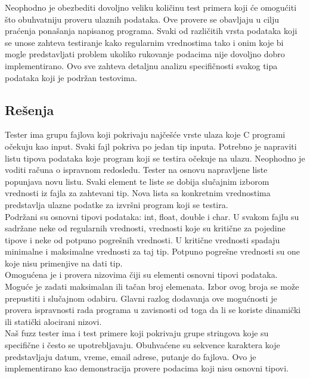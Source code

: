 \documentclass[a4paper]{article}
\begin{document}
{Neophodno je obezbediti dovoljno veliku količinu test primera koji će omogućiti što obuhvatniju proveru ulaznih podataka. Ove provere se obavljaju u cilju praćenja ponašanja napisanog programa. Svaki od različitih vrsta podataka koji se unose zahteva testiranje kako regularnim vrednostima tako i onim koje bi mogle predstavljati problem ukoliko rukovanje podacima nije dovoljno dobro implementirano. Ovo sve zahteva detaljnu analizu specifičnosti svakog tipa podataka koji je podržan testovima.

\subsection{Rešenja}
\label{subsec:resenja_koje_nudi_tester}

Tester ima grupu fajlova koji pokrivaju najčešće vrste ulaza koje C programi očekuju kao input. Svaki fajl pokriva po jedan tip inputa. Potrebno je napraviti listu tipova podataka koje program koji se testira očekuje na ulazu. Neophodno je voditi računa o ispravnom redosledu. Tester na osnovu napravljene liste popunjava novu listu. Svaki element te liste se dobija slučajnim izborom vrednosti iz fajla za zahtevani tip. Nova lista sa konkretnim vrednostima predstavlja ulazne podatke za izvršni program koji se testira. \\

Podržani su osnovni tipovi podataka: int, float, double i char. U svakom fajlu su sadržane neke od regularnih vrednosti, vrednosti koje su kritične za pojedine tipove i neke od potpuno pogrešnih vrednosti. U kritične vrednosti spadaju minimalne i maksimalne vrednosti za taj tip. Potpuno pogrešne vrednosti su one koje nisu primenjive na dati tip. \\

Omogućena je i provera nizovima čiji su elementi osnovni tipovi podataka. Moguće je zadati maksimalan ili tačan broj elemenata. Izbor ovog broja se može prepustiti i slučajnom odabiru. Glavni razlog dodavanja ove mogućnosti je provera ispravnosti rada programa u zavisnosti od toga da li se koriste dinamički ili statički alocirani nizovi. \\

Naš fuzz tester ima i test primere koji pokrivaju grupe stringova koje su specifične i često se upotrebljavaju. Obuhvaćene su sekvence karaktera koje predstavljaju datum, vreme, email adrese, putanje do fajlova. Ovo je implementirano kao demonstracija provere podacima koji nisu osnovni tipovi. \\
 
}
\end{document}
